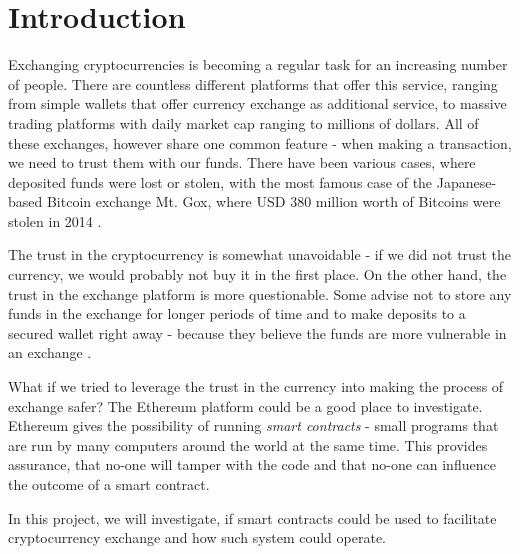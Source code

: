 \section{Introduction}
% 
Exchanging cryptocurrencies is becoming a regular task for an increasing number of people. There are countless different platforms that offer this service, ranging from simple wallets that offer currency exchange as additional service, to massive trading platforms with daily market cap ranging to millions of dollars. All of these exchanges, however share one common feature - when making a transaction, we need to trust them with our funds. There have been various cases, where deposited funds were lost or stolen, with the most famous case of the Japanese-based Bitcoin exchange Mt. Gox, where USD 380 million worth of Bitcoins were stolen in 2014 \cite{Popper2014ApparentTimes}.

The trust in the cryptocurrency is somewhat unavoidable - if we did not trust the currency, we would probably not buy it in the first place. On the other hand, the trust in the exchange platform is more questionable. Some advise not to store any funds in the exchange for longer periods of time and to make deposits to a secured wallet right away - because they believe the funds are more vulnerable in an exchange \cite{McIntosh2018HowScams}.

What if we tried to leverage the trust in the currency into making the process of exchange safer? The Ethereum platform could be a good place to investigate. Ethereum gives the possibility of running \emph{smart contracts} - small programs that are run by many computers around the world at the same time. This provides assurance, that no-one will tamper with the code and that no-one can influence the outcome of a smart contract. 
% 
% 

In this project, we will investigate, if smart contracts could be used to facilitate cryptocurrency exchange and how such system could operate.